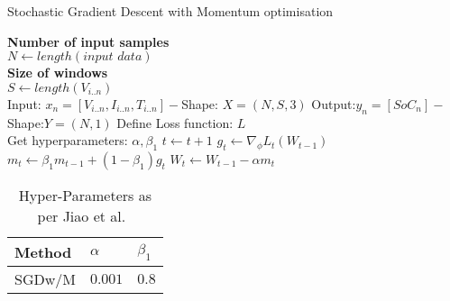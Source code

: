 \begin{algorithm}
  \caption{Stochastic Gradient Descent with Momentum optimisation}
  \begin{algorithmic}[1]
    \STATE \textbf{Number of input samples} \\ $N\gets length(\textit{input data})$\\
    \STATE \textbf{Size of windows} \\ $S\gets length(V_{i..n})$\\
    \STATE Input: $x_n = [V_{i..n}, I_{i..n}, T_{i..n}] - $Shape: $X = (N, S, 3)$
    \STATE Output:$y_n = [SoC_{n}] - $Shape:$Y = (N, 1)$
    \STATE Define Loss function: $L$ \\
           Get hyperparameters: $\alpha, \beta_1$
    \STATE $t \gets t+1$
    \STATE $g_t \gets \nabla_\phi L_t (W_{t-1})$ 
    \STATE $m_t \gets \beta_1 m_{t-1}+(1-\beta_1) g_t $ 
    \STATE $W_t \gets W_{t-1} - \alpha m_t $  
    \ENDWHILE
  \end{algorithmic}
  \label{alg:SGDwM}
\end{algorithm}
\begin{table}[ht]
    \centering
    \caption{Hyper-Parameters as per Jiao et al.~\cite{jiao_gru-rnn_2020}}
    \label{tab:params-jiao}
    \begin{tabular}{ p{6.0cm} p{1.5cm} p{1.5cm}   }
        \hline
        Method     & $\alpha$ & $\beta_1 $  \\
        \hline
        SGDw/M
                & $0.001$ & $0.8$  \\%
        \hline
    \end{tabular}
\end{table}
